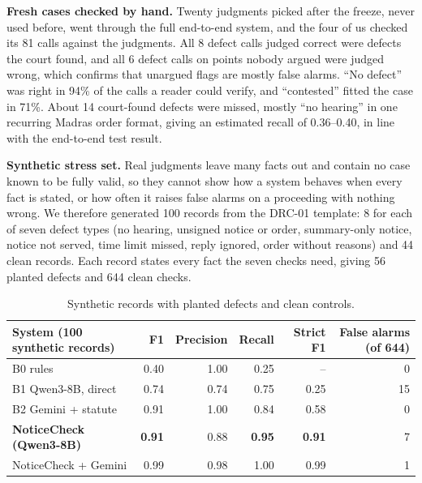 \documentclass[10pt,a4paper]{article}
\begin{document}
\textbf{Fresh cases checked by hand.}\label{sec:fresh} Twenty judgments picked after the freeze, never used before, went through the full end-to-end system, and the four of us checked its 81 calls against the judgments. All 8 defect calls judged correct were defects the court found, and all 6 defect calls on points nobody argued were judged wrong, which confirms that unargued flags are mostly false alarms. ``No defect'' was right in 94\% of the calls a reader could verify, and ``contested'' fitted the case in 71\%. About 14 court-found defects were missed, mostly ``no hearing'' in one recurring Madras order format, giving an estimated recall of 0.36--0.40, in line with the end-to-end test result.

\textbf{Synthetic stress set.} Real judgments leave many facts out and contain no case known to be fully valid, so they cannot show how a system behaves when every fact is stated, or how often it raises false alarms on a proceeding with nothing wrong. We therefore generated 100 records from the DRC-01 template: 8 for each of seven defect types (no hearing, unsigned notice or order, summary-only notice, notice not served, time limit missed, reply ignored, order without reasons) and 44 clean records. Each record states every fact the seven checks need, giving 56 planted defects and 644 clean checks.

\begin{table}[H]
\centering\small
\begin{tabular}{l rrr r r}
\toprule
System (100 synthetic records) & F1 & Precision & Recall & Strict F1 & False alarms (of 644) \\
\midrule
B0 rules & 0.40 & 1.00 & 0.25 & -- & 0 \\
B1 Qwen3-8B, direct & 0.74 & 0.74 & 0.75 & 0.25 & 15 \\
B2 Gemini + statute & 0.91 & 1.00 & 0.84 & 0.58 & 0 \\
\textbf{NoticeCheck (Qwen3-8B)} & \textbf{0.91} & 0.88 & \textbf{0.95} & \textbf{0.91} & 7 \\
NoticeCheck + Gemini & 0.99 & 0.98 & 1.00 & 0.99 & 1 \\
\bottomrule
\end{tabular}
\caption{Synthetic records with planted defects and clean controls.}
\label{tab:synthetic}
\end{table}
\end{document}
